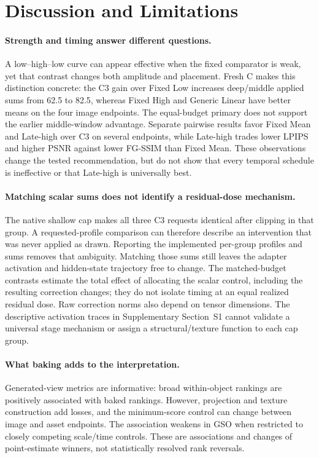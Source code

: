 \documentclass[times,twocolumn,final]{elsarticle}
\begin{document}
\FloatBarrier
\section{Discussion and Limitations}
\label{sec:limitations}

\paragraph{Strength and timing answer different questions.}
A low--high--low curve can appear effective when the fixed comparator is weak, yet that contrast changes both amplitude and placement. Fresh C makes this distinction concrete: the C3 gain over Fixed Low increases deep/middle applied sums from 62.5 to 82.5, whereas Fixed High and Generic Linear have better means on the four image endpoints. The equal-budget primary does not support the earlier middle-window advantage. Separate pairwise results favor Fixed Mean and Late-high over C3 on several endpoints, while Late-high trades lower LPIPS and higher PSNR against lower FG-SSIM than Fixed Mean. These observations change the tested recommendation, but do not show that every temporal schedule is ineffective or that Late-high is universally best.

\paragraph{Matching scalar sums does not identify a residual-dose mechanism.}
The native shallow cap makes all three C3 requests identical after clipping in that group. A requested-profile comparison can therefore describe an intervention that was never applied as drawn. Reporting the implemented per-group profiles and sums removes that ambiguity. Matching those sums still leaves the adapter activation and hidden-state trajectory free to change. The matched-budget contrasts estimate the total effect of allocating the scalar control, including the resulting correction changes; they do not isolate timing at an equal realized residual dose. Raw correction norms also depend on tensor dimensions. The descriptive activation traces in Supplementary Section~S1 cannot validate a universal stage mechanism or assign a structural/texture function to each cap group.

\paragraph{What baking adds to the interpretation.}
Generated-view metrics are informative: broad within-object rankings are positively associated with baked rankings. However, projection and texture construction add losses, and the minimum-score control can change between image and asset endpoints. The association weakens in GSO when restricted to closely competing scale/time controls. These are associations and changes of point-estimate winners, not statistically resolved rank reversals.
\end{document}
